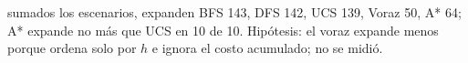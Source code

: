 {sumados los escenarios, expanden BFS 143, DFS 142, UCS 139, Voraz 50, A* 64; A* expande no más que UCS en 10 de 10.}
{Hipótesis: el voraz expande menos porque ordena solo por $h$ e ignora el costo acumulado; no se midió.}
